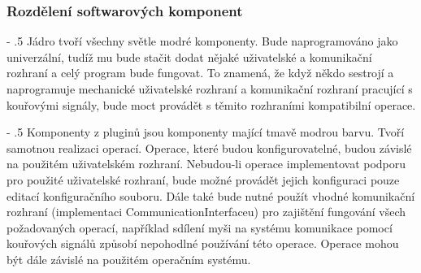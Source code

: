 \documentclass[12pt]{article}
\makeatletter
\newcommand\nodegui{GraphicalUserInterface}
\newcommand\nodeui{UserInterface}
\newcommand\nodepm{PluginManager}
\newcommand\nodeconf{Configurator}
\newcommand\nodeo{Operator}
\newcommand\nodeoc{OperationCreator}
\newcommand\nodeop{OperationProcessor}
\newcommand\nodeci{CommunicationInterface}
\newcommand\nodeos{OperandSelector}
\newcommand\nodenm{NetworkCommunicator}
\newcommand\nodeml{MouseLogger}
\newcommand\nodekl{KeyLogger}
\newcommand\nodems{MouseSimulator}
\newcommand\nodeks{KeySimulator}
\newcommand\nodeses{ScreenEdgeSelector}
\renewcommand\paragraph{%
    \@startsection{paragraph}{4}{0mm}%
       {-\baselineskip}%
       {.5\baselineskip}%
       {\normalfont\normalsize\bfseries}}
\makeatother
\begin{document}
\begin{center}
\end{center}

\subsubsection{Rozdělení softwarových komponent}
\paragraph{Jádro}
tvoří všechny světle modré komponenty. Bude naprogramováno jako univerzální, tudíž mu bude stačit dodat nějaké uživatelské a komunikační rozhraní a celý program bude fungovat. To znamená, že když někdo sestrojí a naprogramuje mechanické uživatelské rozhraní a komunikační rozhraní pracující s kouřovými signály, bude moct provádět s těmito rozhraními kompatibilní operace.

\paragraph{Komponenty z pluginů}
jsou komponenty mající tmavě modrou barvu. Tvoří samotnou realizaci operací. Operace, které budou konfigurovatelné, budou závislé na použitém uživatelském rozhraní. Nebudou-li operace implementovat podporu pro použité uživatelské rozhraní, bude možné provádět jejich konfiguraci pouze editací konfiguračního souboru. Dále také bude nutné použít vhodné komunikační rozhraní (implementaci CommunicationInterfaceu) pro zajištění fungování všech požadovaných operací, například sdílení myši na systému komunikace pomocí kouřových signálů způsobí nepohodlné používání této operace. Operace mohou být dále závislé na použitém operačním systému.
\end{document}

